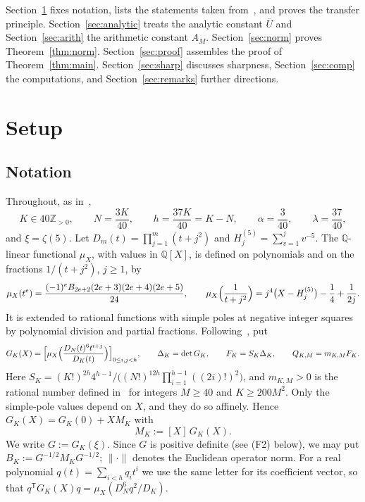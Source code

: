 \documentclass[11pt]{article}
\theoremstyle{remark}
\newcommand{\Z}{\mathbb{Z}}
\newcommand{\Q}{\mathbb{Q}}
\newcommand{\Ubar}{\overline{U}}
\newcommand{\T}{\mathsf{T}}
\begin{document}
Section~\ref{sec:setup} fixes notation, lists the statements taken from~\cite{F}, and proves the transfer principle. Section~\ref{sec:analytic} treats the analytic constant $\Ubar$ and Section~\ref{sec:arith} the arithmetic constant $A_M$. Section~\ref{sec:norm} proves Theorem~\ref{thm:norm}. Section~\ref{sec:proof} assembles the proof of Theorem~\ref{thm:main}. Section~\ref{sec:sharp} discusses sharpness, Section~\ref{sec:comp} the computations, and Section~\ref{sec:remarks} further directions.

\section{Setup}\label{sec:setup}

\subsection{Notation}\label{sec:notation}

Throughout, as in~\cite[(2.1)]{F},
\[
K\in40\Z_{>0},\qquad N=\frac{3K}{40},\qquad h=\frac{37K}{40}=K-N,\qquad\alpha=\frac{3}{40},\qquad\lambda=\frac{37}{40},
\]
and $\xi=\zeta(5)$. Let $D_m(t)=\prod_{j=1}^m(t+j^2)$ and $H^{(5)}_j=\sum_{v=1}^jv^{-5}$. The $\Q$-linear functional $\mu_X$, with values in $\Q[X]$, is defined on polynomials and on the fractions $1/(t+j^2)$, $j\ge1$, by~\cite[(2.2)--(2.3)]{F}
\begin{equation}\label{eq:muX}
\mu_X(t^e)=\frac{(-1)^eB_{2e+2}(2e+3)(2e+4)(2e+5)}{24},\qquad
\mu_X\Bigl(\frac1{t+j^2}\Bigr)=j^4\bigl(X-H^{(5)}_j\bigr)-\frac14+\frac1{2j}.
\end{equation}
It is extended to rational functions with simple poles at negative integer squares by polynomial division and partial fractions. Following~\cite[(2.4)--(2.6)]{F}, put
\[
G_K(X)=\Bigl[\mu_X\Bigl(\frac{D_N(t)^6t^{i+j}}{D_K(t)}\Bigr)\Bigr]_{0\le i,j<h},\qquad\Delta_K=\det G_K,\qquad F_K=S_K\Delta_K,\qquad Q_{K,M}=m_{K,M}F_K .
\]
Here $S_K=(K!)^{2h}4^{h-1}\big/\bigl((N!)^{12h}\prod_{i=1}^{h-1}((2i)!)^2\bigr)$, and $m_{K,M}>0$ is the rational number defined in~\cite[(5.1)--(5.2)]{F} for integers $M\ge40$ and $K\ge200M^2$. Only the simple-pole values depend on $X$, and they do so affinely. Hence $G_K(X)=G_K(0)+XM_K$ with
\[
M_K:=[X]\,G_K(X).
\]
We write $G:=G_K(\xi)$. Since $G$ is positive definite (see (F2) below), we may put $B_K:=G^{-1/2}M_KG^{-1/2}$; $\|\cdot\|$ denotes the Euclidean operator norm. For a real polynomial $q(t)=\sum_{i<h}q_it^i$ we use the same letter for its coefficient vector, so that $q^\T G_K(X)q=\mu_X(D_N^6q^2/D_K)$.
\end{document}
